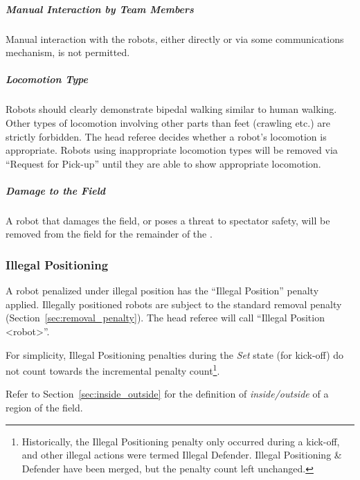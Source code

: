 \subparagraph{Manual Interaction by Team Members}

Manual interaction with the robots, either directly or via some communications mechanism, is not permitted.

\subparagraph{Locomotion Type}
\label{sec:locomotion_type}

Robots should clearly demonstrate bipedal walking similar to human walking. Other types of locomotion involving other parts than feet (crawling etc.) are strictly forbidden.
The head referee decides whether a robot's locomotion is appropriate. Robots using inappropriate locomotion types will be removed via ``Request for Pick-up'' until they are able to show appropriate locomotion.

\subparagraph{Damage to the Field}
\label{sec:damage}

A robot that damages the field, or poses a threat to spectator safety, will be removed from the field for the remainder of the .


\subsubsection{Illegal Positioning}
\label{sec:illegal_positioning}

A robot penalized under illegal position has the ``Illegal Position'' penalty applied. Illegally positioned robots are subject to the standard removal penalty (\cf Section~\ref{sec:removal_penalty}).
The head referee will call ``Illegal Position  \textless robot\textgreater''.

For simplicity, Illegal Positioning penalties during the \textit{Set} state (for kick-off) do not count towards the incremental penalty count\footnote{Historically, the Illegal Positioning penalty only occurred during a kick-off, and other illegal actions were termed Illegal Defender. Illegal Positioning \& Defender have been merged, but the penalty count left unchanged.}.

Refer to Section~\ref{sec:inside_outside} for the definition of \textit{inside/outside} of a region of the field.

